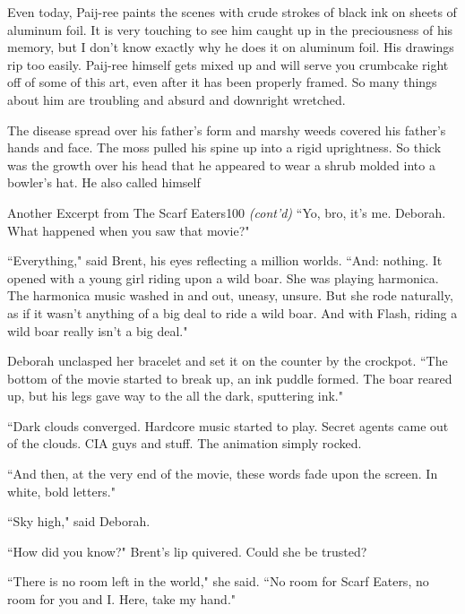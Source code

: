 \documentclass[12pt,twoside]{report}
\begin{document}
Even today, Paij-ree paints the scenes with crude strokes of black ink
on sheets of aluminum foil.  It is very touching to see him caught up
in the preciousness of his memory, but I don't know exactly why he
does it on aluminum foil.  His drawings rip too easily.  Paij-ree
himself gets mixed up and will serve you crumbcake right off of some
of this art, even after it has been properly framed.  So many things
about him are troubling and absurd and downright wretched.

The disease spread over his father's form and marshy weeds covered his
father's hands and face.  The moss pulled his spine up into a rigid
uprightness.  So thick was the growth over his head that he appeared
to wear a shrub molded into a bowler's hat.  He also called himself 

\pagebreak

	\begin{sidebar}{Another Excerpt from The Scarf Eaters}{100}
		\textit{(cont'd)} ``Yo, bro, it's me. Deborah. What happened when you saw that movie?"\vspace{6pt}

		``Everything," said Brent, his eyes reflecting a million worlds. ``And: nothing. It opened with a young girl riding upon a wild boar. She was playing harmonica. The harmonica music washed in and out, uneasy, unsure. But she rode naturally, as if it wasn't anything of a big deal to ride a wild boar. And with Flash, riding a wild boar really isn't a big deal."\vspace{6pt}

		Deborah unclasped her bracelet and set it on the counter by the crockpot.
		``The bottom of the movie started to break up, an ink puddle formed. The boar reared up, but his legs gave way to the all the dark, sputtering ink."\vspace{6pt}

		``Dark clouds converged. Hardcore music started to play. Secret agents came out of the clouds. CIA guys and stuff. The animation simply rocked.\vspace{6pt}

		``And then, at the very end of the movie, these words fade upon the screen. In white, bold letters."\vspace{6pt}
		
		``Sky high," said Deborah.\vspace{6pt}
	
		``How did you know?" Brent's lip quivered. Could she be trusted?\vspace{6pt}
	
		``There is no room left in the world," she said. ``No room for Scarf Eaters, no room for you and I. Here, take my hand."\vspace{6pt}
	\end{sidebar}
\end{document}
